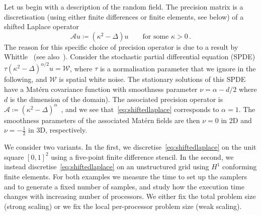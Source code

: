 \documentclass[
fontsize=11pt,
paper=a4,
numbers=noenddot
]{scrartcl}
\begin{document}
Let us begin with a description of the random field. The precision matrix is a discretisation (using either finite differences or finite elements, see below) of a shifted Laplace operator
\begin{equation}
    \label{eq:shiftedlaplace}
    \mathcal{A} u \coloneqq (\kappa^2 - \Delta) u \qquad \text{for some } \kappa > 0 \,.
\end{equation}
The reason for this specific choice of precision operator is due to a result by Whittle~\cite{whittle1954,whittle1963} (see also~\cite{lindgren,lindgrenSPDEApproachGaussian2022}). Consider the stochastic partial differential equation (SPDE) $\tau (\kappa^2 - \Delta)^{\alpha/2} u = \mathcal{W}$, where $\tau$ is a normalisation parameter that we ignore in the following, and $\mathcal{W}$ is spatial white noise. The stationary solutions of this SPDE have a Mat\'ern covariance function with smoothness parameter $\nu = \alpha - d/2$ where $d$ is the dimension of the domain). The associated precision operator is $\mathcal{A} \coloneqq {(\kappa^2 - \Delta)}^\alpha$~\cite[Sec.\ 2.2]{lindgrenSPDEApproachGaussian2022}, and we see that~\eqref{eq:shiftedlaplace} corresponds to $\alpha = 1$. The smoothness parameters of the associated Mat\'ern fields are then $\nu = 0$ in 2D and $\nu = -\frac{1}{2}$ in 3D, respectively.

We consider two variants. In the first, we discretise~\eqref{eq:shiftedlaplace} on the unit square ${[0,1]}^2$ using a five-point finite difference stencil. In the second, we instead discretise~\eqref{eq:shiftedlaplace} on an unstructured grid using $H^1$ conforming finite elements. For both examples we measure the time to set up the samplers and to generate a fixed number of samples, and study how the execution time changes with increasing nunber of processors. We either fix the total problem size (strong scaling) or we fix the local per-processor problem size (weak scaling).

\end{document}
